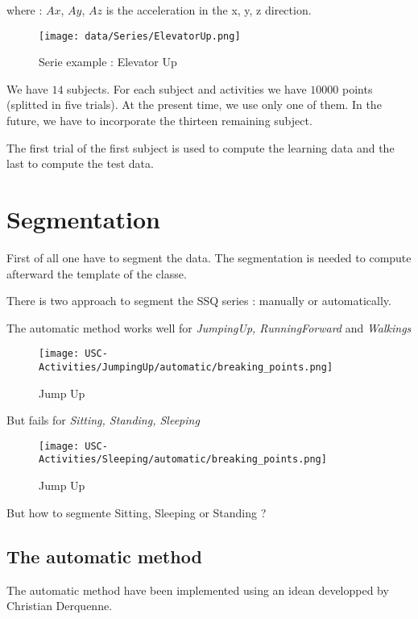 \documentclass[a4,12pt]{article}
\begin{document}
	where : $Ax$, $Ay$, $Az$ is the acceleration in the x, y, z direction.
	
	
	\begin{figure}[H]
		\centering
		\texttt{[image: data/Series/ElevatorUp.png]}
		\caption{Serie example : Elevator Up}
		\label{ElevatorUp}
	\end{figure}
	
	We have $14$ subjects. For each subject and activities we have $10000$ points (splitted in five trials). At the present time, we use only one of them. In the future, we have to incorporate the thirteen remaining subject.
	
	The first trial of the first subject is used to compute the learning data and the last to compute the test data.
	
	\section{Segmentation}
	
	First of all one have to segment the data. The segmentation is needed to compute afterward the template of the classe.
	
	There is two approach to segment the SSQ series : manually or automatically.
	
	The automatic method works well for \textit{JumpingUp, RunningForward} and \textit{Walkings}
	
	\begin{figure}[H]
		\centering
		\texttt{[image: USC-Activities/JumpingUp/automatic/breaking\_points.png]}
		\caption{Jump Up}
		\label{JumpUp}
	\end{figure}
	
	But fails for \textit{Sitting, Standing, Sleeping}
	
	\begin{figure}[H]
		\centering
		\texttt{[image: USC-Activities/Sleeping/automatic/breaking\_points.png]}
		\caption{Jump Up}
		\label{JumpUp}
	\end{figure}
	
	But how to segmente Sitting, Sleeping or Standing ? 
	
	\subsection{The automatic method}
		
		The automatic method have been implemented using an idean developped by Christian Derquenne\cite{derquenne}. 
		
\end{document}
